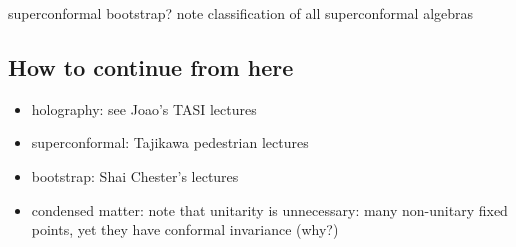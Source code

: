 \documentclass[a4paper,12pt]{article}
\numberwithin{equation}{section}
\begin{document}
superconformal bootstrap? note classification of all superconformal algebras


\subsection{How to continue from here}


\begin{itemize}

\item
holography: see Joao's TASI lectures

\item
superconformal: Tajikawa pedestrian lectures

\item
bootstrap: Shai Chester's lectures

\item
condensed matter:
note that unitarity is unnecessary: many non-unitary fixed points, yet they have conformal invariance (why?)

\end{itemize}



%
%
\end{document}
